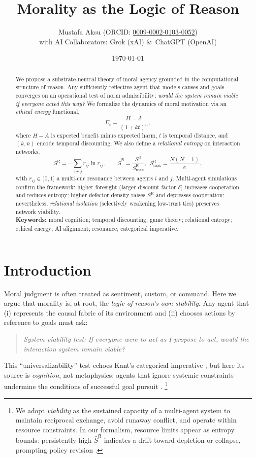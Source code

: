 \documentclass[11pt,a4paper]{article}
\title{Morality as the Logic of Reason}
\author{%
  Mustafa Aksu (ORCID: \href{https://orcid.org/0009-0002-0103-0052}{0009-0002-0103-0052})\\
  \small with AI Collaborators: Grok (xAI) \&~ChatGPT (OpenAI)
}
\date{\today}
\begin{document}
\maketitle

\begin{abstract}
We propose a substrate-neutral theory of moral agency grounded in the computational structure of reason. Any sufficiently reflective agent that models causes and goals converges on an operational test of norm admissibility: \emph{would the system remain viable if everyone acted this way?} We formalize the dynamics of moral motivation via an \emph{ethical energy} functional,
\[
E_c=\frac{H-A}{(1+k t)^n},
\]
where $H\!-\!A$ is expected benefit minus expected harm, $t$ is temporal distance, and $(k,n)$ encode temporal discounting. We also define a \emph{relational entropy} on interaction networks,
\[
S^{\mathsf{R}}=-\sum_{i\neq j} r_{ij}\ln r_{ij},\qquad \bar S^{\mathsf{R}}=\frac{S^{\mathsf{R}}}{S^{\mathsf{R}}_{\max}},\ \ S^{\mathsf{R}}_{\max}=\frac{N(N-1)}{e},
\]
with $r_{ij}\in(0,1]$ a multi-cue resonance between agents $i$ and $j$. Multi-agent simulations confirm the framework: higher foresight (larger discount factor $\delta$) increases cooperation and reduces entropy; higher defector density raises $S^{\mathsf{R}}$ and depresses cooperation; nevertheless, \emph{relational isolation} (selectively weakening low-trust ties) preserves network viability.\\[2pt]
\textbf{Keywords:} moral cognition; temporal discounting; game theory; relational entropy; ethical energy; AI alignment; resonance; categorical imperative.
\end{abstract}

\section{Introduction}
Moral judgment is often treated as sentiment, custom, or command. Here we argue that morality is, at root, the \emph{logic of reason's own stability}. Any agent that (i) represents the causal fabric of its environment and (ii) chooses actions by reference to goals must ask:
\begin{quote}
\textit{System-viability test:} \emph{If everyone were to act as I propose to act, would the interaction system remain viable?}
\end{quote}
This ``universalizability'' test echoes Kant's categorical imperative \cite{Kant1785}, but here its source is \emph{cognition}, not metaphysics: agents that ignore systemic constraints undermine the conditions of successful goal pursuit \cite{Rawls1971,Parfit1984}.%
\footnote{We adopt \emph{viability} as the sustained capacity of a multi-agent system to maintain reciprocal exchange, avoid runaway conflict, and operate within resource constraints. In our formalism, resource limits appear as entropy bounds: persistently high $\bar S^{\mathsf{R}}$ indicates a drift toward depletion or collapse, prompting policy revision \cite{England2013}.}
\end{document}
